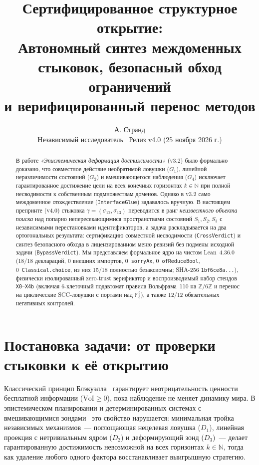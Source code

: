 \documentclass[10pt,a4paper]{article}
\title{\textbf{\Large Сертифицированное структурное открытие:}\\[4pt]
\large Автономный синтез междоменных стыковок, безопасный обход ограничений\\
и верифицированный перенос методов}
\author{А. Странд\\
\small Независимый исследователь \textperiodcentered\ Релиз v4.0 (25 ноября 2026 г.)}
\date{}
\newcommand{\code}[1]{\nolinkurl{#1}}
\begin{document}
\maketitle

\begin{abstract}
В работе \emph{«Эпистемическая деформация достижимости»} (v3.2) было формально доказано, что совместное действие необратимой ловушки ($G_1$), линейной неразличимости состояний ($G_2$) и вмешивающегося наблюдения ($G_4$) исключает гарантированное достижение цели на всех конечных горизонтах $k \in \mathbb{N}$ при полной несводимости к собственным подмножествам доменов. Однако в v3.2 само междоменное отождествление (\code{InterfaceGlue}) задавалось вручную. В настоящем препринте (v4.0) стыковка $\gamma = (\sigma_{12}, \sigma_{13})$ переводится в ранг \emph{неизвестного объекта поиска} над попарно непересекающимися пространствами состояний $S_1, S_2, S_3$ с независимыми перестановками идентификаторов, а задача раскладывается на два ортогональных результата: сертификацию совместной несводимости (\code{CrossVerdict}) и синтез безопасного обхода в лицензированном меню ревизий без подмены исходной задачи (\code{BypassVerdict}). Мы представляем формальное ядро на чистом Lean~4.36.0 (18/18 деклараций, 0 внешних импортов, 0~\code{sorryAx}, 0~\code{ofReduceBool}, 0~\code{Classical.choice}, из них 15/18 полностью безаксиомны; SHA-256 \code{1bf6ce8a...}), физически изолированный zero-trust верификатор и воспроизводимый набор стендов \texttt{X0}--\texttt{X4b} (включая 6-клеточный подавтомат правила Вольфрама~110 на $\mathbb{Z}/6\mathbb{Z}$ и перенос на циклические SCC-ловушки с портами над $\mathbb{F}_3^2$), а также 12/12 обязательных негативных контролей.
\end{abstract}

\section{Постановка задачи: от проверки стыковки к её открытию}

Классический принцип Блэкуэлла~\cite{blackwell1953,howard1966} гарантирует неотрицательность ценности бесплатной информации ($\mathrm{VoI} \ge 0$), пока наблюдение не меняет динамику мира. В эпистемическом планировании и детерминированных системах с вмешивающимися зондами~\cite{fagin1995,vanditmarsch2007,kaelbling1998,strand2026v32} это свойство нарушается: минимальная тройка независимых механизмов~--- поглощающая нецелевая ловушка ($D_1$), линейная проекция с нетривиальным ядром ($D_2$) и деформирующий зонд ($D_3$)~--- делает гарантированную достижимость невозможной на всех горизонтах $k \in \mathbb{N}$, тогда как удаление любого одного фактора восстанавливает выигрышную стратегию.
\end{document}
